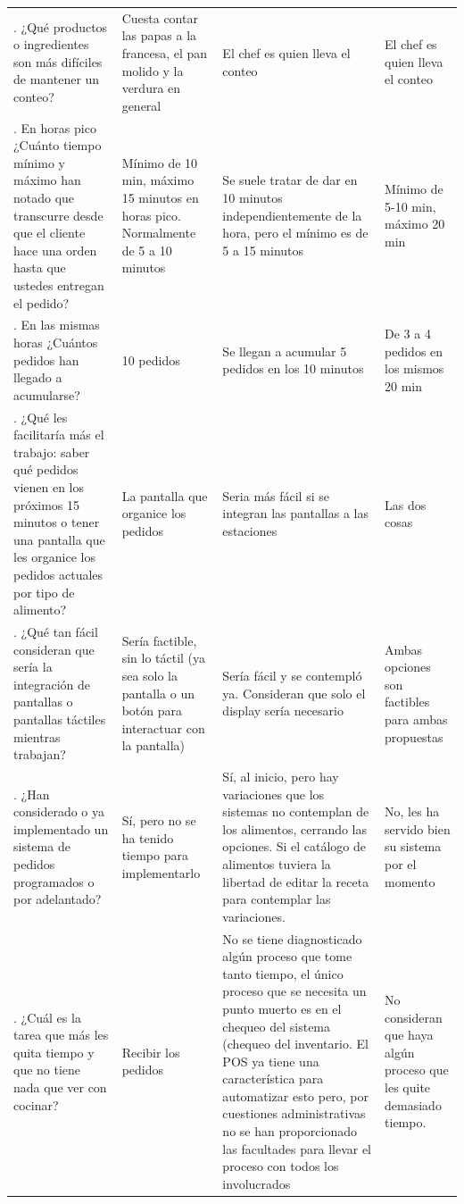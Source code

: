 \begin{longtable}[c]{p{3cm} p{4cm} p{4cm} p{4cm}}
\addlinespace
13. ¿Qué productos o ingredientes son más difíciles de mantener un conteo? & Cuesta contar las papas a la francesa, el pan molido y la verdura en general & El chef es quien lleva el conteo & El chef es quien lleva el conteo \\
\addlinespace
14. En horas pico ¿Cuánto tiempo mínimo y máximo han notado que transcurre desde que el cliente hace una orden hasta que ustedes entregan el pedido? & Mínimo de 10 min, máximo 15 minutos en horas pico. Normalmente de 5 a 10 minutos & Se suele tratar de dar en 10 minutos independientemente de la hora, pero el mínimo es de 5 a 15 minutos & Mínimo de 5-10 min, máximo 20 min \\
\addlinespace
15. En las mismas horas ¿Cuántos pedidos han llegado a acumularse? & 10 pedidos & Se llegan a acumular 5 pedidos en los 10 minutos & De 3 a 4 pedidos en los mismos 20 min \\
\addlinespace
16. ¿Qué les facilitaría más el trabajo: saber qué pedidos vienen en los próximos 15 minutos o tener una pantalla que les organice los pedidos actuales por tipo de alimento? & La pantalla que organice los pedidos & Seria más fácil si se integran las pantallas a las estaciones & Las dos cosas \\
\addlinespace
17. ¿Qué tan fácil consideran que sería la integración de pantallas o pantallas táctiles mientras trabajan? & Sería factible, sin lo táctil (ya sea solo la pantalla o un botón para interactuar con la pantalla) & Sería fácil y se contempló ya. Consideran que solo el display sería necesario & Ambas opciones son factibles para ambas propuestas \\
\addlinespace
18. ¿Han considerado o ya implementado un sistema de pedidos programados o por adelantado? & Sí, pero no se ha tenido tiempo para implementarlo & Sí, al inicio, pero hay variaciones que los sistemas no contemplan de los alimentos, cerrando las opciones. Si el catálogo de alimentos tuviera la libertad de editar la receta para contemplar las variaciones. & No, les ha servido bien su sistema por el momento \\
\addlinespace
19. ¿Cuál es la tarea que más les quita tiempo y que no tiene nada que ver con cocinar? & Recibir los pedidos & No se tiene diagnosticado algún proceso que tome tanto tiempo, el único proceso que se necesita un punto muerto es en el chequeo del sistema (chequeo del inventario. El POS ya tiene una característica para automatizar esto pero, por cuestiones administrativas no se han proporcionado las facultades para llevar el proceso con todos los involucrados & No consideran que haya algún proceso que les quite demasiado tiempo. \\
\end{longtable}
\endgroup

